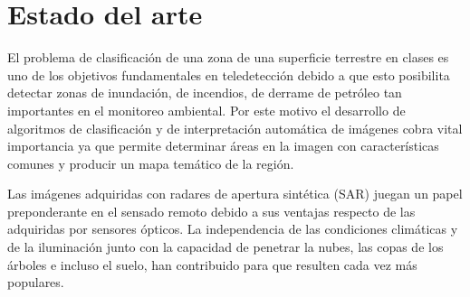 \documentclass[11pt]{article}
\begin{document}



\section{Estado del arte}

El problema de clasificación de una zona de una superficie terrestre en clases es uno de los objetivos fundamentales en teledetección debido a que esto posibilita detectar zonas de inundación, de incendios, de derrame de petróleo tan importantes en el monitoreo ambiental. 
Por este motivo el desarrollo de algoritmos de clasificación y de interpretación automática de imágenes cobra vital importancia  ya que permite determinar áreas en la imagen con características comunes  y producir un mapa temático de la región. 

Las imágenes adquiridas con radares de apertura sintética (SAR) juegan un papel preponderante en el sensado remoto debido a sus ventajas respecto de las adquiridas por sensores ópticos. La independencia de las condiciones climáticas y de la iluminación junto con la capacidad de penetrar la nubes, las copas de los árboles e incluso el suelo, han contribuido para que resulten cada vez más populares. 
\end{document}
